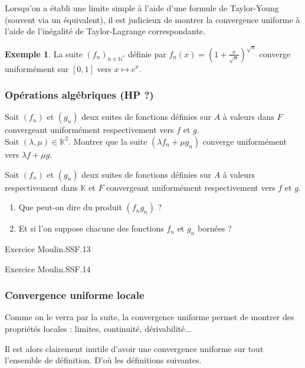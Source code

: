 \documentclass[french]{article}
\newcommand{\N}{\mathbb{N}}
\newcommand{\K}{\mathbb{K}}
\newcommand{\st}{^*}
\theoremstyle{plain}
\theoremstyle{definition}
\newtheorem*{ex}{Exemple}
\theoremstyle{remark}
\begin{document}
\begin{met}
	Lorsqu'on a établi une limite simple à l'aide d'une formule de Taylor-Young (souvent via un équivalent), il est judicieux de montrer la convergence uniforme à l'aide de l'inégalité de Taylor-Lagrange correspondante.
\end{met}

\begin{ex}
	La suite $(f_n)_{n\in\N\st}$ définie par $f_n(x)=\displaystyle\left(1+\frac{x}{\sqrt{n}}\right)^{\sqrt{n}}$ converge uniformément sur $[0,1]$ vers $x\mapsto e^x$.
\end{ex}

\subsubsection*{Opérations algébriques (HP ?)}

\begin{exo}
	Soit $(f_n)$ et $(g_n)$ deux suites de fonctions définies sur $A$ à valeurs dans $F$ convergeant uniformément respectivement vers $f$ et $g$. \\
	Soit $(\lambda,\mu)\in\K^2$. Montrer que la suite $(\lambda f_n+\mu g_n)$ converge uniformément vers $\lambda f+\mu g$.
\end{exo}

\begin{exo}
	Soit $(f_n)$ et $(g_n)$ deux suites de fonctions définies sur $A$ à valeurs respectivement dans $\K$ et $F$ convergeant uniformément respectivement vers $f$ et $g$.
	\begin{enumerate}
		\item Que peut-on dire du produit $(f_n g_n)$ ?
		\item Et si l'on suppose chacune des fonctions $f_n$ et $g_n$ bornées ?
	\end{enumerate}
\end{exo}

Exercice Moulin.SSF.13

Exercice Moulin.SSF.14

\subsubsection*{Convergence uniforme locale}

Comme on le verra par la suite, la convergence uniforme permet de montrer des propriétés locales : limites, continuité, dérivabilité...

Il est alors clairement inutile d'avoir une convergence uniforme sur tout l'ensemble de définition. D'où les définitions suivantes.
\end{document}
